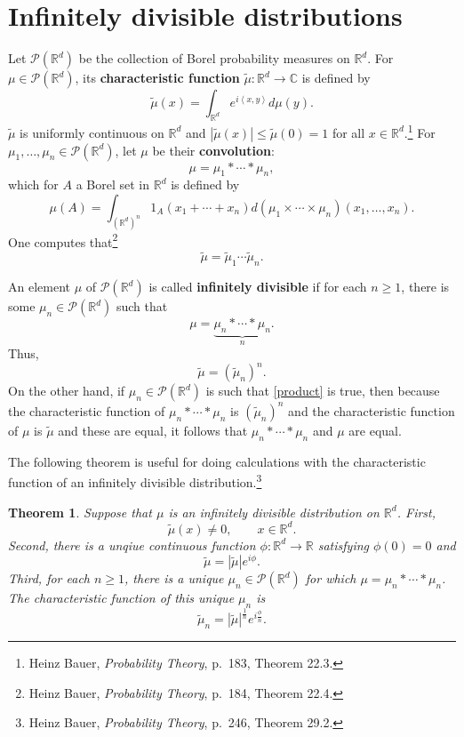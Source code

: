 \documentclass{article}
\newcommand{\inner}[2]{\left\langle #1, #2 \right\rangle}
\newtheorem{theorem}{Theorem}
\theoremstyle{definition}
\begin{document}
\section{Infinitely divisible distributions}
Let $\mathscr{P}(\mathbb{R}^d)$ be the collection of Borel probability measures on $\mathbb{R}^d$. 
For $\mu \in \mathscr{P}(\mathbb{R}^d)$, its \textbf{characteristic function} $\tilde{\mu}:\mathbb{R}^d \to \mathbb{C}$
is defined
by
\[
\tilde{\mu}(x) = \int_{\mathbb{R}^d} e^{i\inner{x}{y}} d\mu(y).
\]
$\tilde{\mu}$ is uniformly continuous on $\mathbb{R}^d$ and $|\tilde{\mu}(x)| \leq \tilde{\mu}(0)=1$ for all
$x \in \mathbb{R}^d$.\footnote{Heinz Bauer, {\em Probability Theory}, p.~183, Theorem 22.3.}
For $\mu_1,\ldots,\mu_n \in \mathscr{P}(\mathbb{R}^d)$, let $\mu$ be their \textbf{convolution}:
\[
\mu = \mu_1* \cdots * \mu_n,
\]
which for $A$ a Borel set in $\mathbb{R}^d$ is defined by
\[
\mu(A) = \int_{(\mathbb{R}^d)^n} 1_A(x_1+\cdots+x_n) d(\mu_1 \times \cdots
\times \mu_n)(x_1,\ldots,x_n).
\]
One computes that\footnote{Heinz Bauer, {\em Probability Theory}, p.~184, Theorem 22.4.}
\[
\tilde{\mu} = \tilde{\mu}_1 \cdots \tilde{\mu}_n.
\]

An element $\mu$ of $\mathscr{P}(\mathbb{R}^d)$ is called \textbf{infinitely divisible} if
for each $n \geq 1$, there is some $\mu_n \in \mathscr{P}(\mathbb{R}^d)$ such that
\begin{equation}
\mu = \underbrace{\mu_n * \cdots * \mu_n}_{n}.
\label{convolution}
\end{equation}
Thus,
\begin{equation}
\tilde{\mu} = (\tilde{\mu}_n)^n.
\label{product}
\end{equation}
On the other hand, if $\mu_n \in \mathscr{P}(\mathbb{R}^d)$ is such that
\eqref{product} is true, then
because the characteristic function of $\mu_n*\cdots*\mu_n$ is 
$(\tilde{\mu}_n)^n$ and the characteristic function of $\mu$ is $\tilde{\mu}$ and these are equal,
it follows that $\mu_n*\cdots*\mu_n$ and $\mu$ are equal. 

The following theorem is useful for doing calculations with the characteristic function of an infinitely
divisible distribution.\footnote{Heinz Bauer, {\em Probability Theory},
p.~246, Theorem 29.2.}

\begin{theorem}
Suppose that $\mu$ is an infinitely divisible distribution on $\mathbb{R}^d$. First,
\[
\tilde{\mu}(x) \neq 0, \qquad x \in \mathbb{R}^d.
\]
Second, there is a unqiue continuous function $\phi:\mathbb{R}^d \to \mathbb{R}$ satisfying
$\phi(0)=0$ and
\[
\tilde{\mu} = |\tilde{\mu}| e^{i\phi}.
\]
Third, for each $n \geq 1$, there is a unique $\mu_n \in \mathscr{P}(\mathbb{R}^d)$ for which
$\mu = \mu_n * \cdots * \mu_n$. The characteristic function of this unique $\mu_n$ is
\[
\tilde{\mu}_n = |\tilde{\mu}|^{\frac{1}{n}} e^{i\frac{\phi}{n}}.
\]
\label{nonzero}
\end{theorem}
\end{document}
